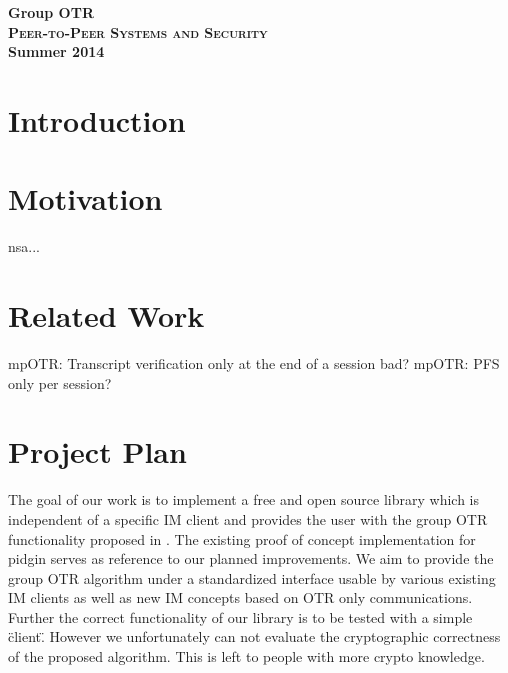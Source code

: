 

\title{}
\author{Markus Teich, Jannik Theiß}
\date{\today}



\begin{center}
\huge \textbf{Group OTR} \\
\vspace{2cm}
\LARGE\textbf{\textsc{Peer-to-Peer Systems and Security}}\\
\vspace{0.5cm}
\textbf{Summer 2014}
\vspace{3.5cm}
\end{center}


\section{Introduction}


\section{Motivation}
nsa...

\section{Related Work}

mpOTR: Transcript verification only at the end of a session bad?
mpOTR: PFS only per session?

\section{Project Plan}

The goal of our work is to implement a free and open source library which is
independent of a specific IM client and provides the user with the group OTR
functionality proposed in \cite{impr-gotr}. The existing proof of concept
implementation for pidgin serves as reference to our planned improvements. We
aim to provide the group OTR algorithm under a standardized interface usable by
various existing IM clients as well as new IM concepts based on OTR only
communications. Further the correct functionality of our library is to be tested
with a simple \"client\". However we unfortunately can not evaluate the
cryptographic correctness of the proposed algorithm. This is left to people with
more crypto knowledge.

